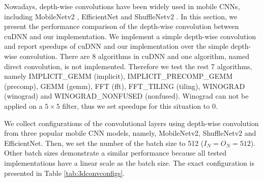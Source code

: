 Nowadays, depth-wise convolutions have been widely used in mobile CNNs, including MobileNetv2 \cite{Sandler_2018_CVPR}, EfficientNet \cite{tan2019efficientnet} and ShuffleNetv2 \cite{Ma_2018_ECCV}. In this section, we present the performance comparison of the depth-wise convolution between cuDNN and our implementation. We implement a simple depth-wise convolution and report speedups of cuDNN and our implementation over the simple depth-wise convolution. There are 8 algorithms in cuDNN and one algorithm, named direct convolution, is not implemented. Therefore we test the rest 7 algorithms, namely IMPLICIT\_GEMM (implicit), IMPLICIT\_PRECOMP\_GEMM (precomp), GEMM (gemm), FFT (fft), FFT\_TILING (tiling), WINOGRAD (winograd) and WINOGRAD\_NONFUSED (nonfused). Winograd can not be applied on a $5 \times 5$ filter, thus we set speedups for this situation to 0.


%

We collect configurations of the convolutional layers using depth-wise convolution from three popular mobile CNN models,
namely, MobileNetv2, ShuffleNetv2 and EfficientNet.
Then, we set the number of the batch size to 512 ($I_N=O_N=512$). Other batch sizes demonstrate a similar performance because all tested implementations have a linear scale as the batch size. The exact configuration is presented in Table \ref{tab:3dconvconfigs}.

